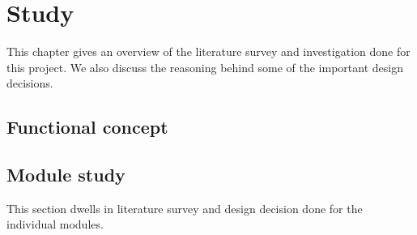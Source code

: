 \chapter{Study}

This chapter gives an overview of the literature survey and investigation done for this project. We also discuss the reasoning behind some of the important design decisions.



\section{Functional concept}


\section{Module study}
This section dwells in literature survey and design decision done for the individual modules.

